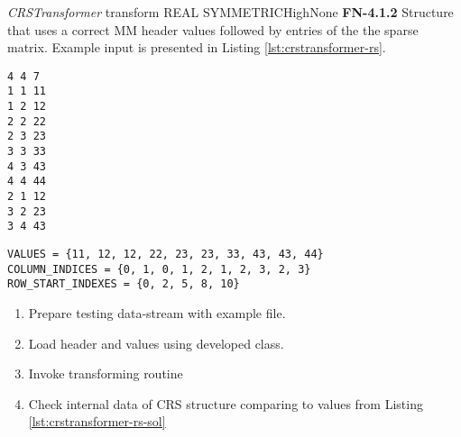 \begin{testcase}{\emph{CRSTransformer} transform REAL SYMMETRIC}{High}{None}
	{
		\textbf{FN-4.1.2}
	}
	{
		Structure that uses a correct \gls{MM} header values followed by entries of the the sparse matrix. Example input is presented in Listing \ref{lst:crstransformer-rs}. 	
	}
	\begin{lstlisting}[label={lst:crstransformer-rs},
	basicstyle=\small,caption={\gls{MM} format data example}, frame=single]
%%MatrixMarket matrix coordinate real symmetric
4 4 7
1 1 11
1 2 12
2 2 22
2 3 23
3 3 33
4 3 43
4 4 44
2 1 12
3 2 23
3 4 43
	\end{lstlisting}
	\begin{lstlisting}[label={lst:crstransformer-rs-sol},
	basicstyle=\small,caption={\gls{CRS} format internal data example}, frame=single]
VALUES = {11, 12, 12, 22, 23, 23, 33, 43, 43, 44}
COLUMN_INDICES = {0, 1, 0, 1, 2, 1, 2, 3, 2, 3}
ROW_START_INDEXES = {0, 2, 5, 8, 10}
	\end{lstlisting}
	{
		\begin{enumerate}
			\item Prepare testing data-stream with example file.
			\item Load header and values using developed class.
			\item Invoke transforming routine 
			\item
			{
				Check internal data of \gls{CRS} structure comparing to values from Listing \ref{lst:crstransformer-rs-sol} 
			}
		\end{enumerate}
	}
\end{testcase}

